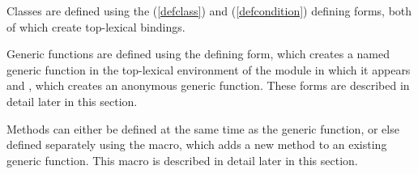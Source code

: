 \begin{optDefinition}
Classes are defined using the  (\ref{defclass}) and
 (\ref{defcondition}) defining forms, both of which
create top-lexical bindings.

Generic functions are defined using the
 defining form, which creates a named
generic function in the top-lexical environment of the module in which it
appears and , which creates an
anonymous generic function.  These forms are described in detail later in this
section.

Methods can either be defined at the same time as the generic function, or else
defined separately using the  macro, which adds a new method
to an existing generic function.  This macro is described in detail later in
this section.
\end{optDefinition}

